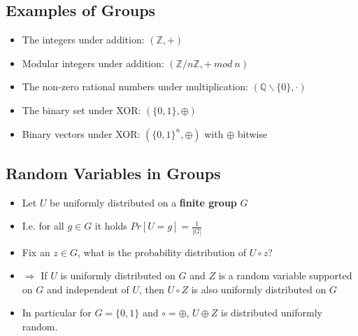 		\subsection{Examples of Groups}
			\begin{itemize}
				\item The integers under addition: $(\mathbb{Z},+)$
				\item Modular integers under addition: $(\mathbb{Z}/n\mathbb{Z}, +\ mod\ n)$
				\item The non-zero rational numbers under multiplication: $(\mathbb{Q} \backslash \{0\}, \cdot)$
				\item The binary set under XOR: $(\{0,1\}, \oplus)$
				\item Binary vectors under XOR: $(\{0,1\}^n, \oplus)$ with $\oplus$ bitwise
			\end{itemize}
		
		\subsection{Random Variables in Groups}
			\begin{itemize}
				\item Let $U$ be uniformly distributed on a \textbf{finite group} $G$
				\item I.e. for all $g \in G$ it holds $Pr[U=g] = \frac{1}{|G|}$
				\item Fix an $z \in G$, what is the probability distribution of $U \circ z$?
				\item $\Rightarrow$ If $U$ is uniformly distributed on $G$ and $Z$ is a random variable supported on $G$ and independent of $U$, 
				then $U \circ Z$ is also uniformly distributed on $G$
				\item In particular for $G = \{0,1\}$ and $\circ = \oplus$, $U \oplus Z$ is distributed uniformly random.
			\end{itemize}
	

